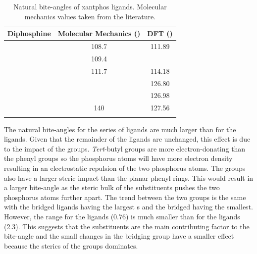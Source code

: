 
\begin{table}[ht]
\small
\caption[Natural bite-angles of xantphos ligands]{Natural bite-angles of xantphos ligands.  Molecular mechanics values taken from the literature.\cite{Kranenburg1995}}
\label{table:biteanglescalculated}
\begin{center}
\begin{tabular}{l c c}
	\toprule
	\bfseries{Diphosphine}	&\bfseries{Molecular Mechanics (\degrees)}&\bfseries{DFT (\degrees)}\\
	\midrule		
	\PhSixantphos		&108.7	&111.89	\\
	\PhThixantphos		&109.4	&\fixme{value}\\
	\PhXantphos		&111.7	&114.18	\\	
	\tBuSixantphos		&		&126.80	\\
	\tBuThixantphos	&		&126.98	\\
	\tBuXantphos		&140		&127.56	\\
	\bottomrule{}
\end{tabular}
\end{center}
\end{table}


The natural bite-angles for the \tBuxantphos{} series of ligands are much larger than for the \Phxantphos{} ligands.  Given that the remainder of the ligands are unchanged, this effect is due to the impact of the \tBu{} groups.  \emph{Tert}-butyl groups are more electron-donating than the phenyl groups so the phosphorus atoms will have more electron density resulting in an electrostatic repulsion of the two phosphorus atoms.  The \tBu{} groups also have a larger steric impact than the planar phenyl rings.  This would result in a larger bite-angle as the steric bulk of the \tBu{} substituents pushes the two phosphorus atoms further apart.  The trend between the two groups is the same with the  bridged ligands having the largest \biteangle{}s and the  bridged having the smallest.  However, the range for the \tBuxantphos{} ligands (0.76\degrees{}) is much smaller than for the \Phxantphos{} ligands (2.3\degrees{}).  This suggests that the \tBu{} substituents are the main contributing factor to the bite-angle and the small changes in the bridging group have a smaller effect because the sterics of the \tBu{} groups dominates.  

